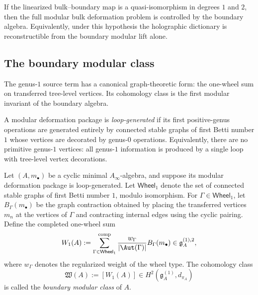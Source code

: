 \begin{corollary}
\label{cor:boundary-determines-bulk}
If the linearized bulk--boundary map is a quasi-isomorphism in degrees $1$ and $2$, then the
full modular bulk deformation problem is controlled by the boundary algebra. Equivalently,
under this hypothesis the holographic dictionary is reconstructible from the boundary modular
lift alone.
\end{corollary}

\subsection{The boundary modular class}
\label{subsec:boundary-modular-class}

The genus-$1$ source term has a canonical graph-theoretic form: the one-wheel sum on transferred tree-level vertices. Its cohomology class is the first modular invariant of the boundary algebra.

\begin{definition}
\label{def:loop-generated-model}
A modular deformation package is \emph{loop-generated} if its first positive-genus operations
are generated entirely by connected stable graphs of first Betti number $1$ whose vertices are
decorated by genus-$0$ operations. Equivalently, there are no primitive genus-$1$ vertices:
all genus-$1$ information is produced by a single loop with tree-level vertex decorations.
\end{definition}

\begin{definition}
\label{def:one-wheel-sum-and-class}
Let $(A,m_\bullet)$ be a cyclic minimal $A_\infty$-algebra, and suppose its modular
deformation package is loop-generated. Let $\mathsf{Wheel}_1$ denote the set of connected
stable graphs of first Betti number $1$, modulo isomorphism. For
$\Gamma\in\mathsf{Wheel}_1$, let $B_\Gamma(m_\bullet)$ be the graph contraction obtained by
placing the transferred vertices $m_n$ at the vertices of $\Gamma$ and contracting internal edges
using the cyclic pairing. Define the completed one-wheel sum
\begin{equation}
\label{eq:one-wheel-sum}
W_1(A):=
\sum_{\Gamma\in\mathsf{Wheel}_1}^{\mathrm{comp}}
\frac{w_\Gamma}{|\Aut(\Gamma)|}
B_\Gamma(m_\bullet)
\in \mathfrak g_A^{(1),2},
\end{equation}
where $w_\Gamma$ denotes the regularized weight of the wheel type. The cohomology class
\begin{equation}
\label{eq:boundary-modular-class}
\mathfrak W(A):=[W_1(A)]\in H^2(\mathfrak g_A^{(1)},d_{\pi_A})
\end{equation}
is called the \emph{boundary modular class} of $A$.
\end{definition}

